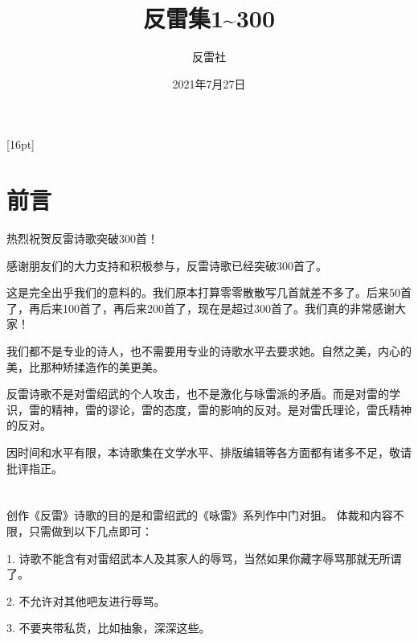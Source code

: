 \documentclass[UTF8,12pt,oneside]{ctexbook}
\title{\fontsize{42}{84}\textbf{反雷集1\textasciitilde 300}}
\author{\LARGE 反雷社}
\date{\LARGE 2021年7月27日}
\begin{document}
    \large
    
    \maketitle %
    
    \setcounter{secnumdepth}{-2} 
    \setcounter{tocdepth}{1}
    [16pt]{\addvspace{2pt}\filright}
    {\contentspush{\thecontentslabel\hspace{0.8em}}}
    {}{\contentspage}

    \chapter{前言}

    热烈祝贺反雷诗歌突破300首！

    感谢朋友们的大力支持和积极参与，反雷诗歌已经突破300首了。
    
    这是完全出乎我们的意料的。我们原本打算零零散散写几首就差不多了。后来50首了，再后来100首了，再后来200首了，现在是超过300首了。我们真的非常感谢大家！

    我们都不是专业的诗人，也不需要用专业的诗歌水平去要求她。自然之美，内心的美，比那种矫揉造作的美更美。

    反雷诗歌不是对雷绍武的个人攻击，也不是激化与咏雷派的矛盾。而是对雷的学识，雷的精神，雷的谬论，雷的态度，雷的影响的反对。是对雷氏理论，雷氏精神的反对。

    因时间和水平有限，本诗歌集在文学水平、排版编辑等各方面都有诸多不足，敬请批评指正。
    
    \tableofcontents

    \chapter{}
    创作《反雷》诗歌的目的是和雷绍武的《咏雷》系列作中门对狙。
    体裁和内容不限，只需做到以下几点即可：
    
    1. 诗歌不能含有对雷绍武本人及其家人的辱骂，当然如果你藏字辱骂那就无所谓了。
    
    2. 不允许对其他吧友进行辱骂。
    
    3. 不要夹带私货，比如抽象，深深这些。
    
    \begin{flushright}
        \songti
    \end{flushright}
    
\end{document}
